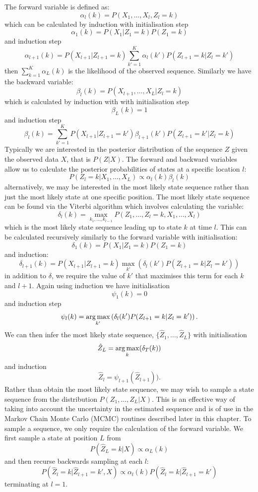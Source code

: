 The forward variable is defined as:
$$\alpha_l(k) = P(X_1,\ldots,X_l,Z_l=k)$$
which can be calculated by induction with initialisation step
$$\alpha_1(k) =   P(X_1|Z_1=k) P(Z_1=k)$$
and induction step 
$$\alpha_{l+1}(k) = P(X_{l+1}|Z_{l+1}=k) \sum_{k'=1}^K \alpha_l(k') P(Z_{l+1}=k|Z_l=k')$$
then $\sum_{k=1}^K \alpha_{L}(k)$ is the likelihood of the observed sequence.  Similarly we have the backward variable:
$$\beta_l(k) = P(X_{l+1},\ldots,X_L|Z_l=k)$$
which is calculated by induction with with initialisation step
$$\beta_L(k) = 1$$
and induction step 
$$\beta_l(k)  =  \sum_{k'=1}^K P(X_{l+1}|Z_{l+1}=k') \beta_{l+1}(k')P(Z_{l+1}=k'|Z_l=k)$$
Typically we are interested in the posterior distribution of the sequence $Z$ given the observed data $X$, that is $P(Z|X)$.  The forward and backward variables allow us to calculate the posterior probabilities of states at a specific location $l$:
$$P(Z_l=k|X_1,\ldots,X_L) \propto \alpha_l(k)\beta_l(k)$$
alternatively, we may be interested in the most likely state sequence rather than just the most likely state at one specific position.  The most likely state sequence can be found via the Viterbi algorithm which involves calculating the variable:
$$\delta_l(k) = \max_{k_1,\ldots,k_{l-1}} P(Z_1,\ldots,Z_l=k,X_1,\ldots,X_l)$$
which is the most likely state sequence leading up to state $k$ at time $l$.  This can be calculated recursively similarly to the forward variable with initialisation:
$$\delta_1(k) =   P(X_1|Z_1=k) P(Z_1=k)$$
and induction:
$$\delta_{l+1}(k) = P(X_{l+1}|Z_{l+1}=k) \max_{k'} \left(  \delta_l(k') P(Z_{l+1}=k|Z_l=k') \right)$$
in addition to $\delta$, we require the value of $k'$ that maximises this term for each $k$ and $l+1$.  Again using induction we have initialisation
$$\psi_1(k)=0$$
and induction step
$$\psi_l(k)=\operatorname*{arg\,max}_{k'} \left(  \delta_l(k') P(Z_{l+1}=k|Z_l=k') \right).$$
We can then infer the most likely state sequence, $\{\hat{Z}_1,\ldots,\hat{Z}_L\}$ with initialisation
$$\hat{Z}_L = \operatorname*{arg\,max}_{k}(\delta_T(k))$$
and induction
$$\hat{Z}_l = \psi_{l+1}( \hat{Z}_{l+1})).$$
Rather than obtain the most likely state sequence, we may wish to sample a state sequence from the distribution $P(Z_1,\ldots,Z_L|X)$.  This is an effective way of taking into account the uncertainty in the estimated sequence and is of use in the Markov Chain Monte Carlo (MCMC) routines described later in this chapter. To sample a sequence, we only require the calculation of the forward variable.  We first sample a state at position $L$ from 
$$P(\hat{Z}_L=k|X)  \propto \alpha_L(k)$$
and then recurse backwards sampling at each $l$:
$$P(\hat{Z}_l=k|\hat{Z}_{l+1}=k',X) \propto \alpha_l(k) P(\hat{Z}_l=k|\hat{Z}_{l+1}=k')$$
terminating at $l=1$.  

